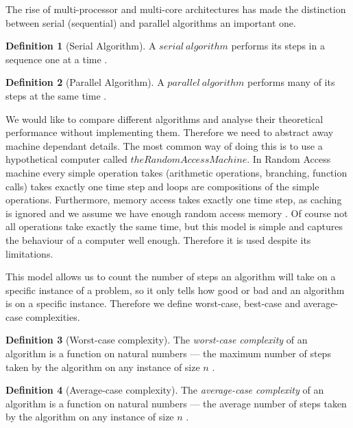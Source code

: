 \documentclass{report}
\theoremstyle{plain}
\theoremstyle{definition}
\newtheorem{definition}{Definition}
\theoremstyle{remark}
\numberwithin{definition}{chapter}
\numberwithin{example}{chapter}
\numberwithin{figure}{chapter}
\numberwithin{theorem}{chapter}
\numberwithin{lemma}{chapter}
\begin{document}
The rise of multi-processor and multi-core architectures has made the distinction between serial (sequential) and parallel algorithms an important one.

\begin{definition}[Serial Algorithm]
A $serial \ algorithm$ performs its steps in a sequence one at a time \cite{berman1996fundamentals}.
\end{definition}

\begin{definition}[Parallel Algorithm]
A $parallel \ algorithm$ performs many of its steps at the same time \cite{berman1996fundamentals}.
\end{definition}

We would like to compare different algorithms and analyse their theoretical performance without implementing them. Therefore we need to abstract away machine dependant details. The most common way of doing this is to use a hypothetical computer called $the Random Access Machine$. In Random Access machine every simple operation takes (arithmetic operations, branching, function calls) takes exactly one time step and loops are compositions of the simple operations. Furthermore, memory access takes exactly one time step, as caching is ignored and we assume we have enough random access memory \cite{skiena504algorithm}. Of course not all operations take exactly the same time, but this model is simple and captures the behaviour of a computer well enough. Therefore it is used despite its limitations.

This model allows us to count the number of steps an algorithm will take on a specific instance of a problem, so it only tells how good or bad and an algorithm is on a specific instance. Therefore we define worst-case, best-case and average-case complexities.

\begin{definition}[Worst-case complexity]
The \emph{worst-case complexity} of an algorithm is a function on natural numbers --- the maximum number of steps taken by the algorithm on any instance of size $n$ \cite{skiena504algorithm}.
\end{definition}

\begin{definition}[Average-case complexity]
The \emph{average-case complexity} of an algorithm is a function on natural numbers --- the average number of steps taken by the algorithm on any instance of size $n$ \cite{skiena504algorithm}.
\end{definition}
\end{document}
